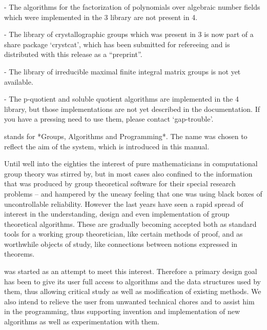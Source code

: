    \item{-} The algorithms for the factorization of polynomials over
   algebraic number fields which were implemented in the {\GAP} 3 library
   are not present in {\GAP} 4.

   \item{-} The library of crystallographic groups which was present in
     {\GAP} 3 is now part of a share package `crystcat', which has been
     submitted for refereeing and is distributed with this release as a
     ``preprint''.

   \item{-}  The library  of  irreducible maximal finite  integral matrix
   groups is not yet available.

   \item{-} The p-quotient and soluble quotient algorithms are
   implemented in the {\GAP} 4 library, but those implementations are not
   yet described in the documentation. If you have a pressing need to use
   them, please contact `gap-trouble'.
\endlist
      







{\GAP} stands for *Groups,  Algorithms  and  Programming*.  The name  was
chosen to reflect the  aim of the  system,  which is  introduced in  this
manual.

Until  well into the  eighties  the  interest  of pure mathematicians  in
computational  group theory  was  stirred  by,  but in  most  cases  also
confined to  the  information  that  was  produced  by  group theoretical
software  for  their special research  problems  --  and  hampered by the
uneasy  feeling  that  one  was   using  black  boxes  of  uncontrollable
reliability.  However the last years have seen a rapid spread of interest
in the understanding, design and even implementation of group theoretical
algorithms.  These are gradually becoming accepted both as standard tools
for a working group theoretician,  like certain  methods of proof, and as
worthwhile  objects of study, like  connections between notions expressed
in theorems.

{\GAP} was  started as  an attempt to meet  this  interest.   Therefore a
primary design goal has  been to give its user full access  to algorithms
and the data  structures used  by them, thus  allowing  critical study as
well as  modification of existing methods.  We also intend to relieve the
user from unwanted technical chores and to assist him in the programming,
thus supporting invention and implementation of new algorithms as well as
experimentation with them.

